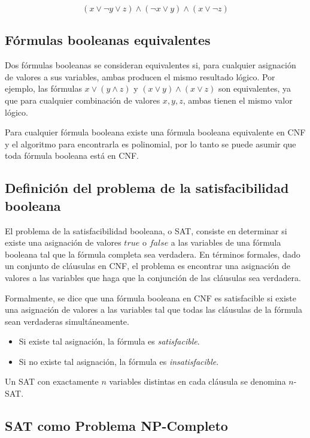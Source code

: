 \documentclass[12pt]{article}
\begin{document}
\[
      (x \vee \neg y \vee z) \wedge (\neg x \vee y) \wedge (x \vee \neg z)
\]

\subsection{Fórmulas booleanas equivalentes}

Dos fórmulas booleanas se consideran equivalentes si, para cualquier asignación de valores a sus variables, ambas producen el mismo resultado lógico. Por ejemplo, las fórmulas \( x \vee (y \wedge z) \) y \( (x \vee y) \wedge (x \vee z) \) son equivalentes, ya que para cualquier combinación de valores \( x, y, z \), ambas tienen el mismo valor lógico.

Para cualquier fórmula booleana existe una fórmula booleana equivalente en CNF \cite{authomataTheory} y 
el algoritmo para encontrarla es polinomial, por lo tanto se puede asumir que toda fórmula booleana está en CNF.

\subsection{Definición del problema de la satisfacibilidad booleana}

El problema de la satisfacibilidad booleana, o SAT, consiste en determinar si existe una asignación de valores \( true \) o \( false \) a las variables de una fórmula booleana tal que la fórmula completa sea verdadera. En términos formales, dado un conjunto de cláusulas en CNF, el problema es encontrar una asignación de valores a las variables que haga que la conjunción de las cláusulas sea verdadera.

Formalmente, se dice que una fórmula booleana en CNF es satisfacible si existe una asignación de valores a las variables tal que todas las cláusulas de la fórmula sean verdaderas simultáneamente.

\begin{itemize}
      \item Si existe tal asignación, la fórmula es \textit{satisfacible}.
      \item Si no existe tal asignación, la fórmula es \textit{insatisfacible}.
\end{itemize}

Un SAT con exactamente $n$ variables distintas en cada cláusula se denomina $n$-SAT.
\subsection{SAT como Problema NP-Completo}
\end{document}
